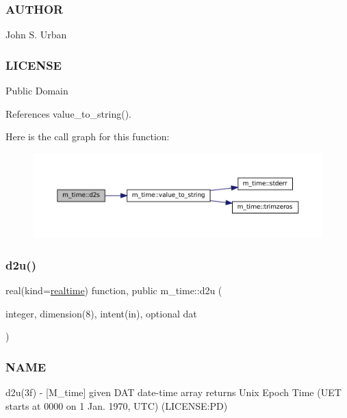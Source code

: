 \subsubsection*{A\+U\+T\+H\+OR}

John S. Urban \subsubsection*{L\+I\+C\+E\+N\+SE}

Public Domain 

References value\+\_\+to\+\_\+string().

Here is the call graph for this function\+:\nopagebreak
\begin{figure}[H]
\begin{center}
\leavevmode
\includegraphics[width=350pt]{namespacem__time_a0b88094db657df167f8e57aa4362259e_cgraph}
\end{center}
\end{figure}
\mbox{\label{namespacem__time_a1506e2889a156387df4481ed0534be81}} 
\subsubsection{\texorpdfstring{d2u()}{d2u()}}
{\footnotesize\ttfamily real(kind=\mbox{\hyperlink{namespacem__time_ac10ea9e8d59ec74eaa7d89f2517d7422}{realtime}}) function, public m\+\_\+time\+::d2u (\begin{DoxyParamCaption}\item[{integer, dimension(8), intent(in), optional}]{dat }\end{DoxyParamCaption})}



\subsubsection*{N\+A\+ME}

d2u(3f) -\/ \mbox{[}M\+\_\+time\mbox{]} given D\+AT date-\/time array returns Unix Epoch Time (U\+ET starts at 0000 on 1 Jan. 1970, U\+TC) (L\+I\+C\+E\+N\+SE\+:PD) 

